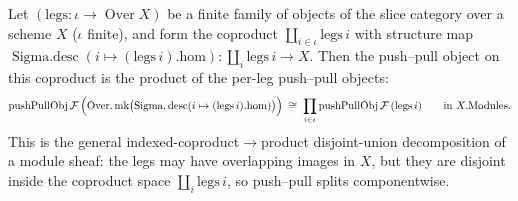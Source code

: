 \begin{lemma}
  \label{mk-lem:pushPull_coprod_prod}

  Let \((\mathrm{legs} : \iota \to \operatorname{Over} X)\) be a finite family of objects of
  the slice category over a scheme \(X\) (\(\iota\) finite), and form the coproduct
  \(\coprod_{i \in \iota} \mathrm{legs}\,i\) with structure map
  \(\operatorname{Sigma.desc}(i \mapsto (\mathrm{legs}\,i).\mathrm{hom}) : \coprod_i
  \mathrm{legs}\,i \to X\). Then the push--pull object on this coproduct is the product of
  the per-leg push--pull objects:
  \[
    \operatorname{pushPullObj}\mathcal{F}\,\Bigl(\operatorname{Over.mk}\bigl(
      \operatorname{Sigma.desc}(i \mapsto (\mathrm{legs}\,i).\mathrm{hom})\bigr)\Bigr)
      \;\cong\;
    \prod_{i \in \iota} \operatorname{pushPullObj}\mathcal{F}\,(\mathrm{legs}\,i)
    \qquad \text{in } X.\mathrm{Modules}.
  \]
  This is the general indexed-coproduct\(\to\)product disjoint-union decomposition of a
  module sheaf: the legs may have overlapping images in \(X\), but they are disjoint inside
  the coproduct space \(\coprod_i \mathrm{legs}\,i\), so push--pull splits componentwise.
\end{lemma}
